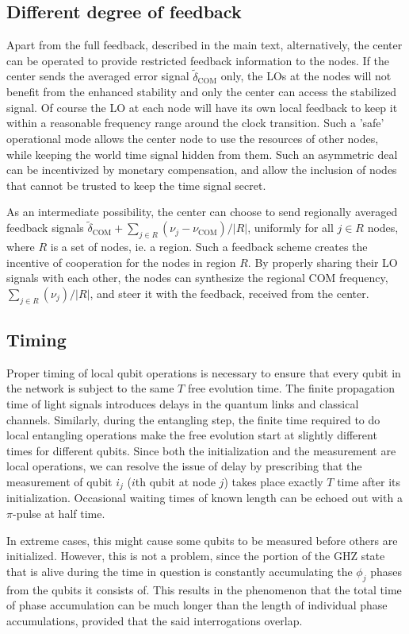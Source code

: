 \subsection{Different degree of feedback}
Apart from the full feedback, described in the main text, alternatively, the
center can be operated to provide restricted feedback information to the nodes.
If the center sends the averaged error signal $\tilde \delta_\mathrm{COM}$ only,
the LOs at the nodes will not benefit from the enhanced stability and only the
center can access the stabilized signal. Of course the LO at each node will have
its own local feedback to keep it within a reasonable frequency range around the
clock transition. Such a 'safe' operational mode allows the center node to
use the resources of other nodes, while keeping the world time signal hidden
from them. Such an asymmetric deal can be incentivized by monetary compensation,
and allow the inclusion of nodes that cannot be trusted to keep the time signal
secret.

As an intermediate possibility, the center can choose to send regionally
averaged feedback signals $\tilde\delta_\mathrm{COM} + \sum_{j\in R}(\nu_j -
\nu_\mathrm{COM})/|R|$, uniformly for all $j\in R$ nodes, where $R$ is a set of
nodes, ie. a region. Such a feedback scheme creates the incentive of cooperation
for the nodes in region $R$. By properly sharing their LO signals with each
other, the nodes can synthesize the regional COM frequency, $\sum_{j\in
R}(\nu_j)/|R|$, and steer it with the feedback, received from the center.


\subsection{Timing}
Proper timing of local qubit operations is necessary to ensure that every qubit
in the network is subject to the same $T$ free evolution time.
The finite propagation time of light signals introduces delays in the quantum
links and classical channels.
Similarly, during the entangling step, the finite time required to do local
entangling operations make the free evolution start at slightly different times
for different qubits. Since both the initialization and the measurement are local
operations, we can resolve the issue of delay by prescribing that the
measurement of qubit $i_j$ ($i$th qubit at node $j$) takes place exactly $T$
time after its initialization. Occasional waiting times of known length can be
echoed out with a $\pi$-pulse at half time. 

In extreme cases, this might cause
some qubits to be measured before others are initialized. However, this is not a
problem, since the portion of the GHZ state that is alive during the
time in question is constantly accumulating the $\phi_j$ phases from the qubits
it consists of. This results in the phenomenon that the total time of phase accumulation can be much longer than the length of individual
phase accumulations, provided that the said interrogations overlap.

